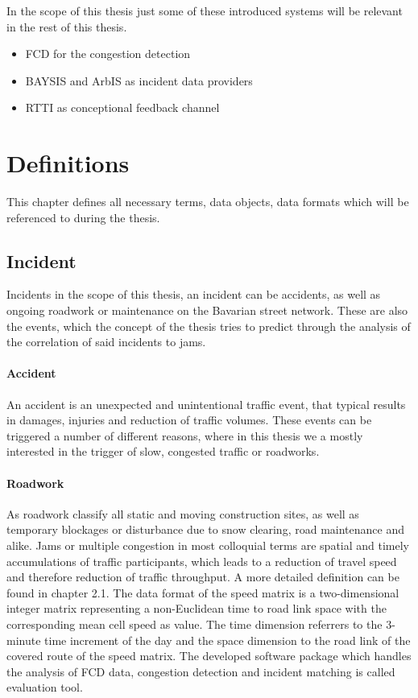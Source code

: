 \documentclass[a4paper,12pt]{report}
\begin{document}

\par In the scope of this thesis just some of these introduced systems will be relevant in the rest of this thesis. 
\begin{itemize}
  \item FCD for the congestion detection
  \item BAYSIS and ArbIS as incident data providers
  \item RTTI as conceptional feedback channel
\end{itemize}

\chapter{Definitions}
	This chapter defines all necessary terms, data objects, data formats which will be referenced to during the thesis.
\section{Incident}
		Incidents in the scope of this thesis, an incident can be accidents, as well as ongoing roadwork or maintenance on the Bavarian street network. These are also the events, which the concept of the thesis tries to predict through the analysis of the correlation of said incidents to jams.
	\subsubsection{Accident}
		An accident is an unexpected and unintentional traffic event, that typical results in damages, injuries and reduction of traffic volumes. These events can be triggered a number of different reasons, where in this thesis we a mostly interested in the trigger of slow, congested traffic or roadworks.
	\subsubsection{Roadwork}
		As roadwork classify all static and moving construction sites, as well as temporary blockages or disturbance due to snow clearing, road maintenance and alike. 
	Jams or multiple congestion in most colloquial terms are spatial and timely accumulations of traffic participants, which leads to a reduction of travel speed and therefore reduction of traffic throughput. A more detailed definition can be found in chapter 2.1.
	The data format of the speed matrix is a two-dimensional integer matrix representing a non-Euclidean time to road link space with the corresponding mean cell speed as value. The time dimension referrers to the 3-minute time increment of the day and the space dimension to the road link of the covered route of the speed matrix.
	The developed software package which handles the analysis of FCD data, congestion detection and incident matching is called evaluation tool.
	
\end{document}
